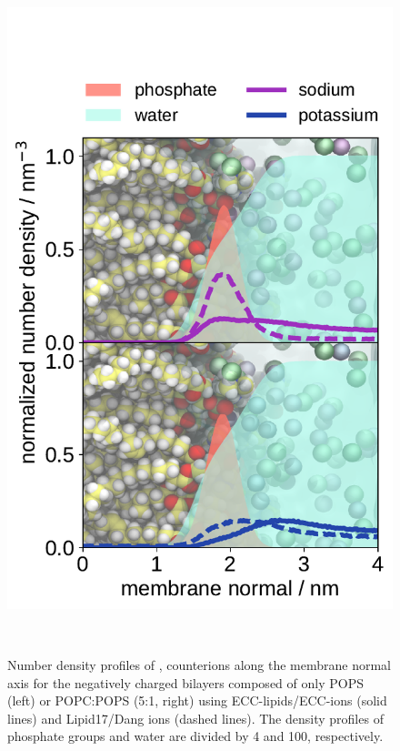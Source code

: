 \documentclass[journal=jpcbfk,manuscript=article]{achemso}
\newlength{\figheight}
\begin{document}
\begin{figure}[tbp!]
  \includegraphics[height=\figheight]{../img/ecc_pops/density_profiles_na-k-counterions_wat_phos_compar_5PC-1PS_ecclipids-lipid17.pdf}
  \caption{\label{fig:POPS-counterions-dens}
    Number density profiles of ,  counterions along the membrane normal axis 
    for the negatively charged bilayers composed of only POPS (left) or POPC:POPS (5:1, right) 
    using ECC-lipids/ECC-ions (solid lines) and Lipid17/Dang ions (dashed lines).  
    The density profiles of phosphate groups and water are divided by 4 and 100, respectively.  
}
 \\
\end{figure} 
\end{document}
